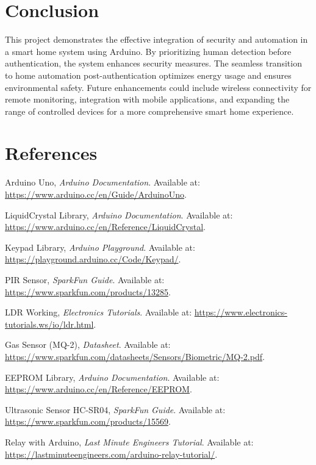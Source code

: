 \documentclass[a4paper,12pt]{article}
\begin{document}
\section{Conclusion}
This project demonstrates the effective integration of security and automation in a smart home system using Arduino. By prioritizing human detection before authentication, the system enhances security measures. The seamless transition to home automation post-authentication optimizes energy usage and ensures environmental safety. Future enhancements could include wireless connectivity for remote monitoring, integration with mobile applications, and expanding the range of controlled devices for a more comprehensive smart home experience.

\section{References}
\begin{thebibliography}{9}

Arduino Uno, \emph{Arduino Documentation}. Available at: \url{https://www.arduino.cc/en/Guide/ArduinoUno}.

LiquidCrystal Library, \emph{Arduino Documentation}. Available at: \url{https://www.arduino.cc/en/Reference/LiquidCrystal}.

Keypad Library, \emph{Arduino Playground}. Available at: \url{https://playground.arduino.cc/Code/Keypad/}.

PIR Sensor, \emph{SparkFun Guide}. Available at: \url{https://www.sparkfun.com/products/13285}.

LDR Working, \emph{Electronics Tutorials}. Available at: \url{https://www.electronics-tutorials.ws/io/ldr.html}.

Gas Sensor (MQ-2), \emph{Datasheet}. Available at: \url{https://www.sparkfun.com/datasheets/Sensors/Biometric/MQ-2.pdf}.

EEPROM Library, \emph{Arduino Documentation}. Available at: \url{https://www.arduino.cc/en/Reference/EEPROM}.

Ultrasonic Sensor HC-SR04, \emph{SparkFun Guide}. Available at: \url{https://www.sparkfun.com/products/15569}.

Relay with Arduino, \emph{Last Minute Engineers Tutorial}. Available at: \url{https://lastminuteengineers.com/arduino-relay-tutorial/}.

\end{thebibliography}
\end{document}
